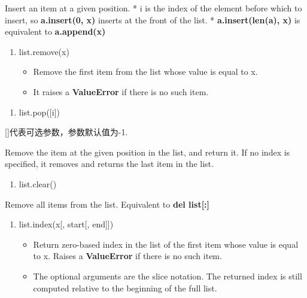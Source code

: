 \documentclass[11pt]{article}
\providecommand{\tightlist}{%
      \setlength{\itemsep}{0pt}\setlength{\parskip}{0pt}}
\begin{document}
Insert an item at a given position. * i is the index of the element
before which to insert, so \textbf{a.insert(0, x)} inserts at the front
of the list. * \textbf{a.insert(len(a), x)} is equivalent to
\textbf{a.append(x)}

    \begin{enumerate}
\def\labelenumi{\arabic{enumi}.}
\setcounter{enumi}{3}
\item
  list.remove(x)

  \begin{itemize}
  \tightlist
  \item
    Remove the first item from the list whose value is equal to x.
  \item
    It raises a \textbf{ValueError} if there is no such item.
  \end{itemize}
\end{enumerate}

    \begin{enumerate}
\def\labelenumi{\arabic{enumi}.}
\setcounter{enumi}{4}
\tightlist
\item
  list.pop({[}i{]})
\end{enumerate}

{[}{]}代表可选参数，参数默认值为-1.

Remove the item at the given position in the list, and return it. If no
index is specified, it removes and returns the last item in the list.

    \begin{enumerate}
\def\labelenumi{\arabic{enumi}.}
\setcounter{enumi}{5}
\tightlist
\item
  list.clear()
\end{enumerate}

Remove all items from the list. Equivalent to \textbf{del list{[}:{]}}

    \begin{enumerate}
\def\labelenumi{\arabic{enumi}.}
\setcounter{enumi}{6}
\item
  list.index(x{[}, start{[}, end{]}{]})

  \begin{itemize}
  \item
    Return zero-based index in the list of the first item whose value is
    equal to x. Raises a \textbf{ValueError} if there is no such item.
  \item
    The optional arguments are the slice notation. The returned index is
    still computed relative to the beginning of the full list.
  \end{itemize}
\end{enumerate}
\end{document}
